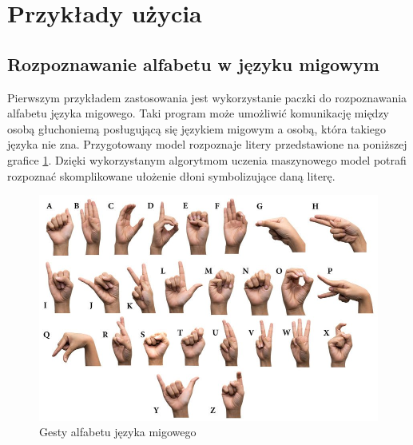 \section{Przykłady użycia}
\subsection{Rozpoznawanie alfabetu w języku migowym}
\quad Pierwszym przykładem zastosowania jest wykorzystanie paczki do rozpoznawania alfabetu języka migowego. Taki program może umożliwić komunikację między osobą głuchoniemą posługującą się językiem migowym a osobą, która takiego języka nie zna. Przygotowany model rozpoznaje litery przedstawione na poniższej grafice \ref{img:alphabet}. Dzięki wykorzystanym algorytmom uczenia maszynowego model potrafi rozpoznać skomplikowane ułożenie dłoni symbolizujące daną literę.  


\begin{figure}[H]
    \begin{center}
        \includegraphics[width=15cm]{../images/american_sign_language.jpg}
        \caption{Gesty alfabetu języka migowego}
        \label{img:alphabet}
    \end{center}
\end{figure}

